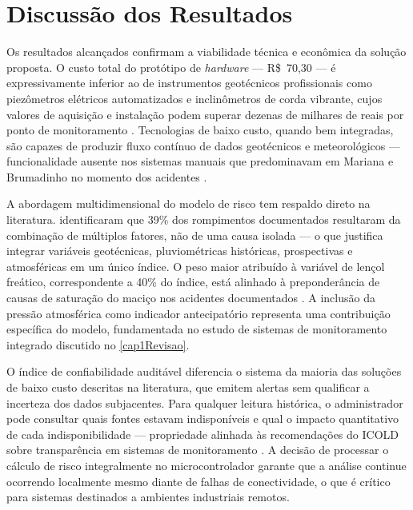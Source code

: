 \section{Discussão dos Resultados}
\label{sec:discussao}

Os resultados alcançados confirmam a viabilidade técnica e econômica
da solução proposta. O custo total do protótipo de \textit{hardware}
--- R\$~70,30 --- é expressivamente inferior ao de instrumentos
geotécnicos profissionais como piezômetros elétricos automatizados e
inclinômetros de corda vibrante, cujos valores de aquisição e instalação
podem superar dezenas de milhares de reais por ponto de monitoramento
\cite{quispe2018instrumentacao}. Tecnologias de baixo custo, quando bem
integradas, são capazes de produzir fluxo contínuo de dados geotécnicos
e meteorológicos --- funcionalidade ausente nos sistemas manuais que
predominavam em Mariana e Brumadinho no momento dos acidentes
\cite{taliberti2025tragedia}.

A abordagem multidimensional do modelo de risco tem respaldo direto
na literatura.  identificaram que 39\% dos
rompimentos documentados resultaram da combinação de múltiplos fatores,
não de uma causa isolada --- o que justifica integrar variáveis
geotécnicas, pluviométricas históricas, prospectivas e atmosféricas em
um único índice. O peso maior atribuído à variável de lençol freático,
correspondente a 40\% do índice, está alinhado à preponderância de
causas de saturação do maciço nos acidentes documentados
\cite{robertson2019feijaoson2019}. A inclusão da pressão atmosférica
como indicador antecipatório representa uma contribuição específica do
modelo, fundamentada no estudo de sistemas de monitoramento integrado
discutido no \autoref{cap1Revisao}.

O índice de confiabilidade auditável diferencia o sistema da maioria
das soluções de baixo custo descritas na literatura, que emitem alertas
sem qualificar a incerteza dos dados subjacentes. Para qualquer leitura
histórica, o administrador pode consultar quais fontes estavam
indisponíveis e qual o impacto quantitativo de cada indisponibilidade
--- propriedade alinhada às recomendações do ICOLD sobre transparência
em sistemas de monitoramento \cite{icold2022tailings}. A decisão de
processar o cálculo de risco integralmente no microcontrolador garante
que a análise continue ocorrendo localmente mesmo diante de falhas de
conectividade, o que é crítico para sistemas destinados a ambientes
industriais remotos.

